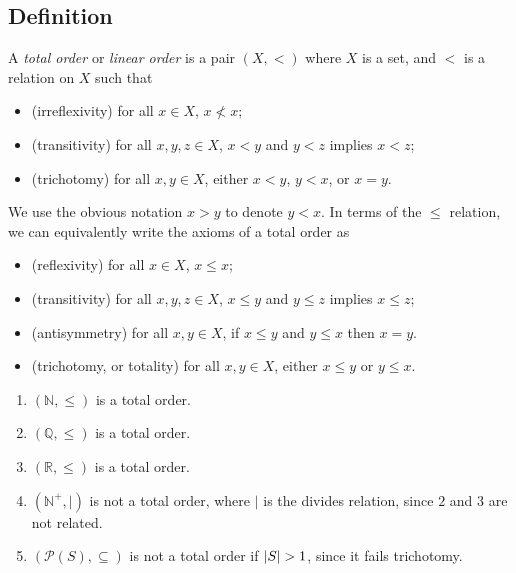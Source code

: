 \subsection{Definition}
\begin{definition}
    A \emph{total order} or \emph{linear order} is a pair \( (X, <) \) where \( X \) is a set, and \( < \) is a relation on \( X \) such that
    \begin{itemize}
        \item (irreflexivity) for all \( x \in X \), \( x \not < x \);
        \item (transitivity) for all \( x, y, z \in X \), \( x < y \) and \( y < z \) implies \( x < z \);
        \item (trichotomy) for all \( x, y \in X \), either \( x < y \), \( y < x \), or \( x = y \).
    \end{itemize}
\end{definition}
We use the obvious notation \( x > y \) to denote \( y < x \).
In terms of the \( \leq \) relation, we can equivalently write the axioms of a total order as
\begin{itemize}
    \item (reflexivity) for all \( x \in X \), \( x \leq x \);
    \item (transitivity) for all \( x, y, z \in X \), \( x \leq y \) and \( y \leq z \) implies \( x \leq z \);
    \item (antisymmetry) for all \( x, y \in X \), if \( x \leq y \) and \( y \leq x \) then \( x = y \).
    \item (trichotomy, or totality) for all \( x, y \in X \), either \( x \leq y \) or \( y \leq x \).
\end{itemize}
\begin{example}
    \begin{enumerate}
        \item \( (\mathbb N, \leq) \) is a total order.
        \item \( (\mathbb Q, \leq) \) is a total order.
        \item \( (\mathbb R, \leq) \) is a total order.
        \item \( (\mathbb N^+, |) \) is not a total order, where \( | \) is the divides relation, since \( 2 \) and \( 3 \) are not related.
        \item \( (\mathcal P(S), \subseteq) \) is not a total order if \( \abs{S} > 1 \), since it fails trichotomy.
    \end{enumerate}
\end{example}
